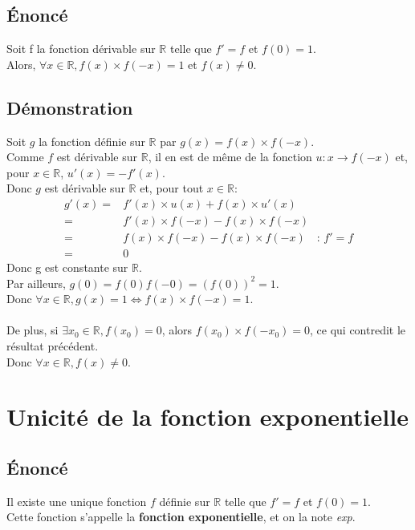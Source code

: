 \documentclass[12px]{article}
\begin{document}
	\subsection{\'Enoncé}
	Soit f la fonction dérivable sur $\mathbb{R}$ telle que $f'=f$ et $f(0)=1$.\\
	Alors, $\forall x\in\mathbb{R}, f(x)\times f(-x)=1$ et $f(x)\not= 0$.
		
	\subsection{Démonstration}
	Soit $g$ la fonction définie sur $\mathbb{R}$ par $g(x)=f(x)\times f(-x)$.\\
	Comme $f$ est dérivable sur $\mathbb{R}$, il en est de même de la fonction $u:x\rightarrow f(-x)$ et, pour $x\in\mathbb{R}$, $u'(x)=-f'(x)$.\\
	Donc $g$ est dérivable sur $\mathbb{R}$ et, pour tout $x\in\mathbb{R}$:
	\begin{align*}
		g'(x)=&f'(x)\times u(x) + f(x)\times u'(x)\\
			 =&f'(x)\times f(-x) - f(x)\times f(-x)\\
			 =&f(x)\times f(-x) - f(x)\times f(-x)\quad :\, f'=f\\
			 =&0
	\end{align*}
	Donc g est constante sur $\mathbb{R}$.\\
	Par ailleurs, $g(0)=f(0)f(-0)=(f(0))^2=1$.\\
	Donc $\forall x\in \mathbb{R}, g(x)=1 \Leftrightarrow f(x)\times f(-x)=1$.\\
	\\
	De plus, si $\exists x_0\in\mathbb{R}, f(x_0)=0$, alors $f(x_0)\times f(-x_0)=0$, ce qui contredit le résultat précédent.\\
	Donc $\forall x\in\mathbb{R}, f(x)\not=0$.
	
	
	\newpage
	\section{Unicité de la fonction exponentielle}
	
	\subsection{\'Enoncé}
	Il existe une unique fonction $f$ définie sur $\mathbb{R}$ telle que $f'=f$ et $f(0)=1$.\\
	Cette fonction s'appelle la \textbf{fonction exponentielle}, et on la note \emph{exp}.
	
\end{document}
